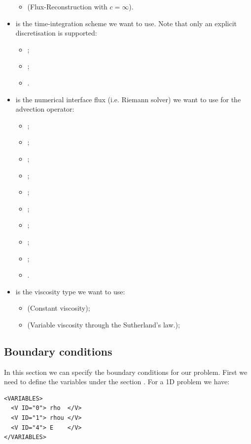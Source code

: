 \begin{itemize}
\begin{itemize}
\item {} (Flux-Reconstruction with $c = \infty$).
\end{itemize}
\item {} is the time-integration scheme we want to use. 
Note that only an explicit discretisation is supported:
\begin{itemize}
\item {};
\item {};
\item {}.
\end{itemize}
\item {} is the numerical interface flux (i.e. Riemann solver) 
we want to use for the advection operator:
\begin{itemize}
\item {};
\item {}; 
\item {}; 
\item {}; 
\item {}; 
\item {};
\item {};
\item {};
\item {};
\item {}.
\end{itemize}
\item {} is the viscosity type we want to use:
\begin{itemize}
\item {} (Constant viscosity);
\item {} (Variable viscosity through the Sutherland's law.);
\end{itemize}
\end{itemize}

\subsection*{Boundary conditions}
In this section we can specify the boundary conditions for our problem.
First we need to define the variables under the section .
For a 1D problem we have:
\begin{lstlisting}[style=XmlStyle]        
<VARIABLES>
  <V ID="0"> rho  </V>
  <V ID="1"> rhou </V>
  <V ID="4"> E    </V>
</VARIABLES>
\end{lstlisting}

